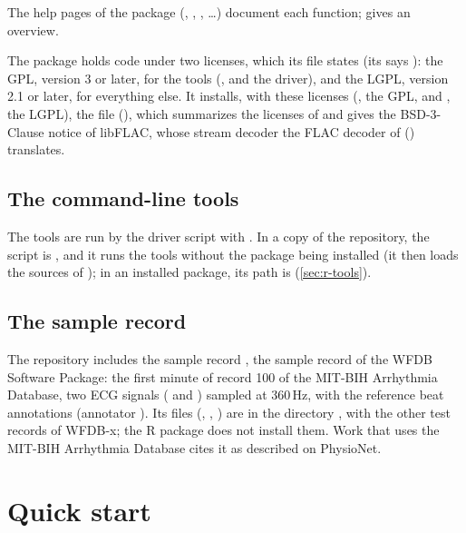 The help pages of the package (, ,
, \ldots) document each function;  gives an overview.

The package holds code under two licenses, which its file  states (its
 says ): the GPL, version 3 or later, for
the tools (,  and the driver), and the LGPL, version 2.1
or later, for everything else. It installs, with these licenses (, the GPL,
and , the LGPL), the file 
(), which summarizes the licenses of
\wfdbx{} and gives the BSD-3-Clause notice of libFLAC, whose stream decoder the FLAC
decoder of \wfdbx{} () translates.

\subsection{The command-line tools}

The tools are run by the driver script  with . In a copy of the
repository, the script is , and it runs the tools without the
package being installed (it then loads the sources of ); in an installed package,
its path is 
(\cref{sec:r-tools}).

\subsection{The sample record}
\label{sec:r-resources}

The repository includes the sample record , the sample record of the WFDB
Software Package: the first minute of record 100 of the MIT-BIH Arrhythmia Database, two
ECG signals ( and ) sampled at 360\,Hz, with the reference beat
annotations (annotator ). Its files (, ,
) are in the directory , with the other test records of
WFDB-x; the R package does not install them. Work that uses the MIT-BIH Arrhythmia
Database cites it as described on PhysioNet.

\section{Quick start}
\label{sec:r-quickstart}

